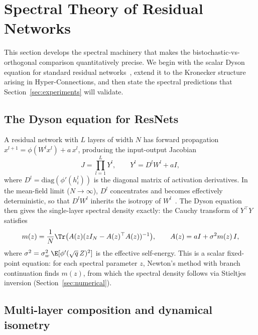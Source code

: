 
\section{Spectral Theory of Residual Networks}\label{sec:resnets}

This section develops the spectral machinery that makes the bistochastic-vs-orthogonal comparison quantitatively precise. We begin with the scalar Dyson equation for standard residual networks~\cite{tarnowski2019dynamical}, extend it to the Kronecker structure arising in Hyper-Connections, and then state the spectral predictions that Section~\ref{sec:experiments} will validate.

\subsection{The Dyson equation for ResNets}\label{sec:dyson-resnet}

A residual network with $L$ layers of width $N$ has forward propagation $x^{l+1} = \phi(W^l x^l) + a\, x^l$, producing the input-output Jacobian
\begin{equation}\label{eq:jacobian}
J = \prod_{l=1}^{L} Y^l, \qquad Y^l = D^l W^l + aI,
\end{equation}
where $D^l = \mathrm{diag}(\phi'(h^l_i))$ is the diagonal matrix of activation derivatives. In the mean-field limit ($N \to \infty$), $D^l$ concentrates and becomes effectively deterministic, so that $D^l W^l$ inherits the isotropy of $W^l$~\cite{pennington2017resurrecting}. The Dyson equation then gives the single-layer spectral density exactly: the Cauchy transform of $Y^\top Y$ satisfies
\begin{equation}\label{eq:dyson-fp}
m(z) = \frac{1}{N}\Tr\bigl(A(z)(zI_N - A(z)^\top A(z))^{-1}\bigr), \qquad A(z) = aI + \sigma^2 m(z)\, I,
\end{equation}
where $\sigma^2 = \sigma_w^2 \,\E[\phi'(\sqrt{q}\, Z)^2]$ is the effective self-energy. This is a scalar fixed-point equation: for each spectral parameter $z$, Newton's method with branch continuation finds $m(z)$, from which the spectral density follows via Stieltjes inversion (Section~\ref{sec:numerical}).

\subsection{Multi-layer composition and dynamical isometry}\label{sec:multi-layer}

